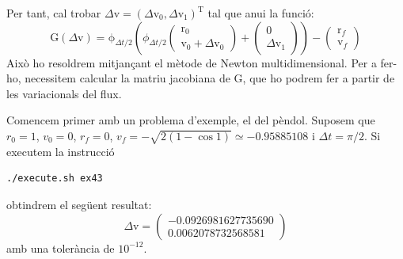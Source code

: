 \documentclass[10pt,a4paper]{article}
\newcommand{\vf}[1]{\boldsymbol{\mathrm{#1}}} %
\theoremstyle{definition}
\theoremstyle{remark}
\begin{document}
Per tant, cal trobar $\Delta\vf{v}={(\Delta\vf{v}_0,\Delta\vf{v}_1)}^\mathrm{T}$ tal que anu\lgem i la funció:
$$
  \vf{G}(\Delta\vf{v}) = \vf\phi_{\Delta t/2}\left(\phi_{\Delta t/2}\begin{pmatrix}
    \vf{r}_0 \\
    \vf{v}_0 + \Delta\vf{v}_0
  \end{pmatrix}+\begin{pmatrix}
    \vf{0} \\
    \Delta\vf{v}_1
  \end{pmatrix}\right) - \begin{pmatrix}
    \vf{r}_f \\
    \vf{v}_f
  \end{pmatrix}
$$
Això ho resoldrem mitjançant el mètode de Newton multidimensional. Per a fer-ho, necessitem calcular la matriu jacobiana de $\vf{G}$, que ho podrem fer a partir de les variacionals del flux.

Comencem primer amb un problema d'exemple, el del pèndol. Suposem que $r_0=1$, $v_0=0$, $r_f=0$, $v_f=-\sqrt{2(1-\cos 1)}
  \simeq -0.95885108$ i $\Delta t=\pi/2$. Si executem la instrucció
\begin{lstlisting}[language=Bash]
./execute.sh ex43
\end{lstlisting}
obtindrem el següent resultat:
$$
  \Delta\vf{v} = \begin{pmatrix}
    -0.0926981627735690 \\
    0.0062078732568581
  \end{pmatrix}
$$
amb una tolerància de $10^{-12}$.
\end{document}
